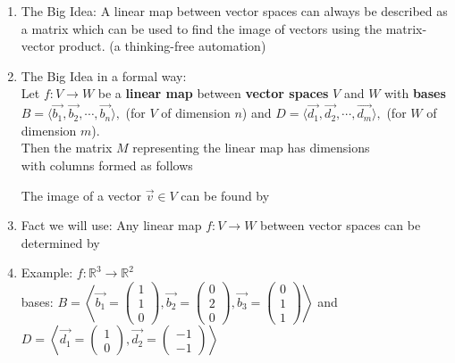 \documentclass[11pt,fleqn]{article}
\begin{document}
\renewcommand{\headrulewidth}{0pt}
\newcommand{\blank}[1]{\rule{#1}{0.75pt}}
\renewcommand{\d}{\displaystyle}

\newcommand{\bpm}{\begin{pmatrix}}
\newcommand{\epm}{\end{pmatrix}}
\newcommand{\bbm}{\begin{bmatrix}}
\newcommand{\ebm}{\end{bmatrix}}

\vspace*{-0.7in}

\begin{center}
  \large {}
\end{center}

\begin{enumerate}
\item The Big Idea: A linear map between vector spaces can always be described as a matrix which can be used to find the image of vectors using the matrix-vector product. (a thinking-free automation)

\item The Big Idea in a formal way:\\
Let $f: V \to W$ be a \textbf{linear map} between \textbf{vector spaces} $V$ and $W$ with \textbf{bases} $B=\langle \vec{b_1}, \vec{b_2},\cdots,\vec{b_n}\rangle,$ (for $V$ of dimension $n$) and $D=\langle \vec{d_1}, \vec{d_2},\cdots,\vec{d_m}\rangle,$ (for $W$ of dimension $m$). \\

Then the matrix $M$ representing the linear map has dimensions \\

with columns formed as follows\\
\vfill

The image of a vector $\vec{v} \in V$ can be found by \\
\vfill

\item Fact we will use: Any linear map $f:V \to W$ between vector spaces can be determined by 
\vspace{1in}
\newpage
\item Example: $f: \mathbb{R}^3 \to \mathbb{R}^2$\\

bases: $B=\left\langle \vec{b_1}=\bpm 1\\1\\0\epm, \vec{b_2}=\bpm 0\\2\\0\epm,\vec{b_3}=\bpm 0\\1\\1\epm\right\rangle$ and $D=\left\langle \vec{d_1}=\bpm 1\\0\epm, \vec{d_2}=\bpm -1\\-1\epm\right\rangle$\\


\end{enumerate}
\end{document}
